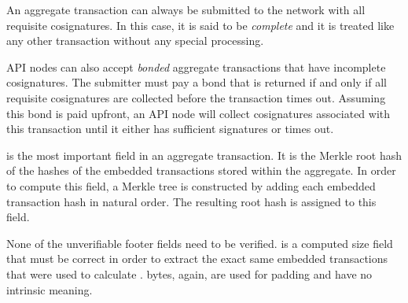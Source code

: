 An aggregate transaction can always be submitted to the network with all requisite cosignatures.
In this case, it is said to be \emph{complete} and it is treated like any other transaction without any special processing.

API nodes can also accept \emph{bonded} aggregate transactions that have incomplete cosignatures.
The submitter must pay a bond that is returned if and only if all requisite cosignatures are collected before the transaction times out.
Assuming this bond is paid upfront, an API node will collect cosignatures associated with this transaction until it either has sufficient signatures or times out.

 is the most important field in an aggregate transaction.
It is the Merkle root hash of the hashes of the embedded transactions stored within the aggregate.
In order to compute this field, a Merkle tree is constructed by adding each embedded transaction hash in natural order.
The resulting root hash is assigned to this field.

None of the unverifiable footer fields need to be verified.
 is a computed size field that must be correct in order to extract the exact same embedded transactions that were used to calculate .
 bytes, again, are used for padding and have no intrinsic meaning.

